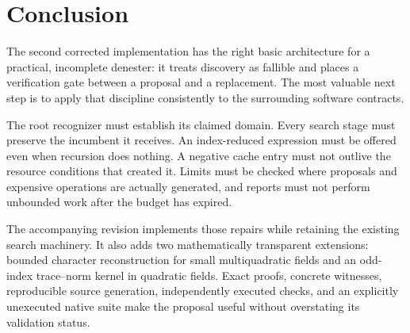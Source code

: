 \documentclass[11pt,a4paper]{article}
\theoremstyle{definition}\newtheorem{definition}[proposition]{Definition}
\theoremstyle{remark}\newtheorem{remark}[proposition]{Remark}
\begin{document}
\section{Conclusion}
The second corrected implementation has the right basic architecture for a
practical, incomplete denester: it treats discovery as fallible and places a
verification gate between a proposal and a replacement. The most valuable next
step is to apply that discipline consistently to the surrounding software
contracts.

The root recognizer must establish its claimed domain. Every search stage must
preserve the incumbent it receives. An index-reduced expression must be offered
even when recursion does nothing. A negative cache entry must not outlive the
resource conditions that created it. Limits must be checked where proposals
and expensive operations are actually generated, and reports must not perform
unbounded work after the budget has expired.

The accompanying revision implements those repairs while retaining the existing
search machinery. It also adds two mathematically transparent extensions:
bounded character reconstruction for small multiquadratic fields and an odd-index
trace--norm kernel in quadratic fields. Exact proofs, concrete witnesses,
reproducible source generation, independently executed checks, and an explicitly
unexecuted native suite make the proposal useful without overstating its
validation status.

\appendix
\end{document}
